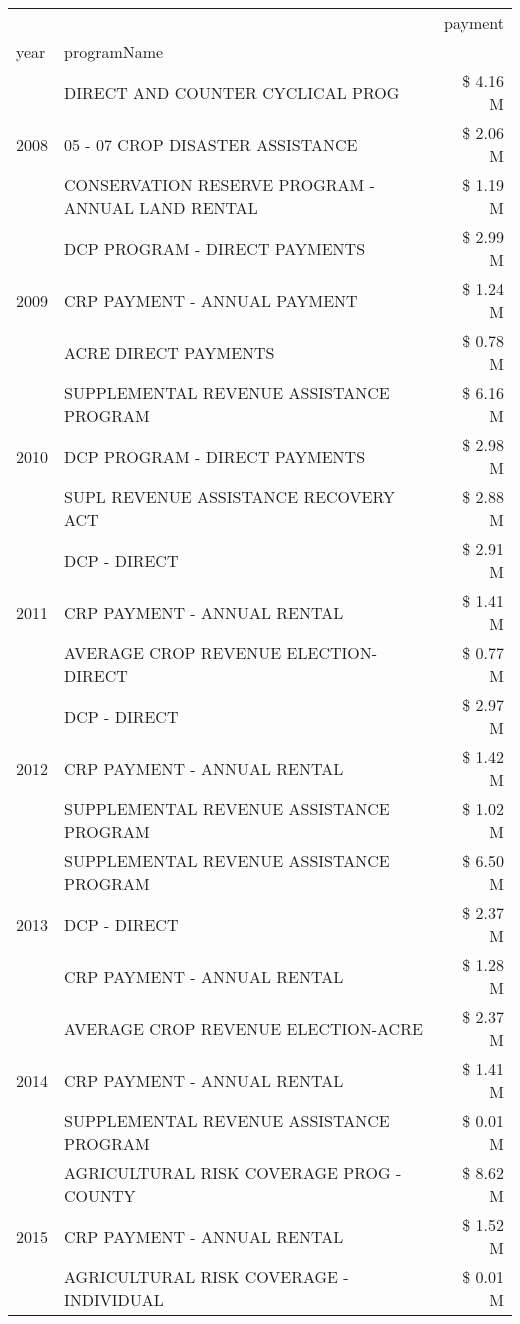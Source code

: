 \begin{tabular}{llr}
\toprule
 &  & payment \\
year & programName &  \\
\midrule
\multirow[t]{3}{*}{2008} & DIRECT AND COUNTER CYCLICAL PROG & \$ 4.16 M \\
 & 05 - 07 CROP DISASTER ASSISTANCE & \$ 2.06 M \\
 & CONSERVATION RESERVE PROGRAM - ANNUAL LAND RENTAL & \$ 1.19 M \\
\cline{1-3}
\multirow[t]{3}{*}{2009} & DCP PROGRAM - DIRECT PAYMENTS & \$ 2.99 M \\
 & CRP PAYMENT - ANNUAL PAYMENT & \$ 1.24 M \\
 & ACRE DIRECT PAYMENTS & \$ 0.78 M \\
\cline{1-3}
\multirow[t]{3}{*}{2010} & SUPPLEMENTAL REVENUE ASSISTANCE PROGRAM & \$ 6.16 M \\
 & DCP PROGRAM - DIRECT PAYMENTS & \$ 2.98 M \\
 & SUPL REVENUE ASSISTANCE RECOVERY ACT & \$ 2.88 M \\
\cline{1-3}
\multirow[t]{3}{*}{2011} & DCP - DIRECT & \$ 2.91 M \\
 & CRP PAYMENT - ANNUAL RENTAL & \$ 1.41 M \\
 & AVERAGE CROP REVENUE ELECTION-DIRECT & \$ 0.77 M \\
\cline{1-3}
\multirow[t]{3}{*}{2012} & DCP - DIRECT & \$ 2.97 M \\
 & CRP PAYMENT - ANNUAL RENTAL & \$ 1.42 M \\
 & SUPPLEMENTAL REVENUE ASSISTANCE PROGRAM & \$ 1.02 M \\
\cline{1-3}
\multirow[t]{3}{*}{2013} & SUPPLEMENTAL REVENUE ASSISTANCE PROGRAM & \$ 6.50 M \\
 & DCP - DIRECT & \$ 2.37 M \\
 & CRP PAYMENT - ANNUAL RENTAL & \$ 1.28 M \\
\cline{1-3}
\multirow[t]{3}{*}{2014} & AVERAGE CROP REVENUE ELECTION-ACRE & \$ 2.37 M \\
 & CRP PAYMENT - ANNUAL RENTAL & \$ 1.41 M \\
 & SUPPLEMENTAL REVENUE ASSISTANCE PROGRAM & \$ 0.01 M \\
\cline{1-3}
\multirow[t]{3}{*}{2015} & AGRICULTURAL RISK COVERAGE PROG - COUNTY & \$ 8.62 M \\
 & CRP PAYMENT - ANNUAL RENTAL & \$ 1.52 M \\
 & AGRICULTURAL RISK COVERAGE - INDIVIDUAL & \$ 0.01 M \\

\end{tabular}
